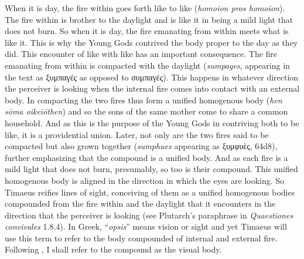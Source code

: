 When it is day, the fire within goes forth like to like (\emph{homoion pros homoion}). The fire within is brother to the daylight and is like it in being a mild light that does not burn. So when it is day, the fire emanating from within meets what is like it. This is why the Young Gods contrived the body proper to the day as they did. This encounter of like with like has an important consequence. The fire emanating from within is compacted with the daylight (\emph{sumpages}, appearing in the text as {\sbl ξυμπαγές} as opposed to {\sbl συμπαγές}). This happens in whatever direction the perceiver is looking when the internal fire comes into contact with an external body. In compacting the two fires thus form a unified homogenous body (\emph{hen sōma oikeiōthen}) and so the sons of the same mother come to share a common household. And as this is the purpose of the Young Gods in contriving both to be like, it is a providential union. Later, not only are the two fires said to be compacted but also grown together (\emph{sumphues} appearing as {\sbl ξυμφυὲς}, 64d8), further emphasizing that the compound is a unified body. And as each fire is a mild light that does not burn, presumably, so too is their compound. This unified homogenous body is aligned in the direction in which the eyes are looking. So Timaeus reifies lines of sight, conceiving of them as a unified homogenous bodies compounded from the fire within and the daylight that it encounters in the direction that the perceiver is looking (see Plutarch's paraphrase in \emph{Quaestiones convivales} 1.8.4). In Greek, ``\emph{opsis}'' means vision or sight and yet Timaeus will use this term to refer to the body compounded of internal and external fire. Following \citet[221]{Ierodiakonou:2005ly}, I shall refer to the compound as the visual body.

